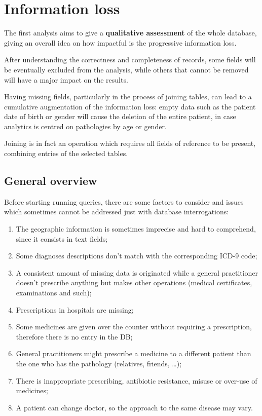 \chapter{Information loss} 
The first analysis aims to give a \textbf{qualitative assessment} of the whole database, giving an overall idea on how impactful is the progressive information loss. 

After understanding the correctness and completeness of records, some fields will be eventually excluded from the analysis, while others that cannot be removed will have a major impact on the results.

Having missing fields, particularly in the process of joining tables, can lead to a cumulative augmentation of the information loss: empty data such as the patient date of birth or gender will cause the deletion of the entire patient, in case analytics is centred on pathologies by age or gender.

Joining is in fact an operation which requires all fields of reference to be present, combining entries of the selected tables\cite{DC2}.

\section{General overview}
Before starting running queries, there are some factors to consider and issues which sometimes cannot be addressed just with database interrogations:
\begin{enumerate}
	\item The geographic information is sometimes imprecise and hard to comprehend, since it consists in text fields;
	\item Some diagnoses descriptions don't match with the corresponding ICD-9 code;
	\item A consistent amount of missing data is originated while a general practitioner doesn't prescribe anything but makes other operations (medical certificates, examinations and such);
	\item Prescriptions in hospitals are missing;
	\item Some medicines are given over the counter without requiring a prescription, therefore there is no entry in the DB;
	\item General practitioners might prescribe a medicine to a different patient than the one who has the pathology (relatives, friends, \dots);
	\item There is inappropriate prescribing, antibiotic resistance, misuse or over-use of medicines;
	\item A patient can change doctor, so the approach to the same disease may vary.
\end{enumerate}

